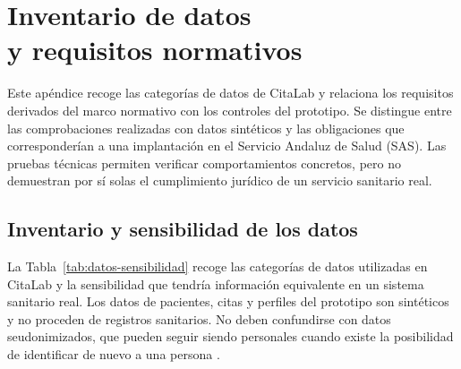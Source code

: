 \chapter[Inventario de datos y requisitos normativos]{Inventario de datos\\y requisitos normativos}
\label{app:requisitos-normativos}

Este apéndice recoge las categorías de datos de CitaLab y relaciona los requisitos derivados del marco normativo con los controles del prototipo. Se distingue entre las comprobaciones realizadas con datos sintéticos y las obligaciones que corresponderían a una implantación en el Servicio Andaluz de Salud (SAS). Las pruebas técnicas permiten verificar comportamientos concretos, pero no demuestran por sí solas el cumplimiento jurídico de un servicio sanitario real.

\section{Inventario y sensibilidad de los datos}

La Tabla~\ref{tab:datos-sensibilidad} recoge las categorías de datos utilizadas en CitaLab y la sensibilidad que tendría información equivalente en un sistema sanitario real. Los datos de pacientes, citas y perfiles del prototipo son sintéticos y no proceden de registros sanitarios. No deben confundirse con datos seudonimizados, que pueden seguir siendo personales cuando existe la posibilidad de identificar de nuevo a una persona \citep{eu2016gdpr}.

